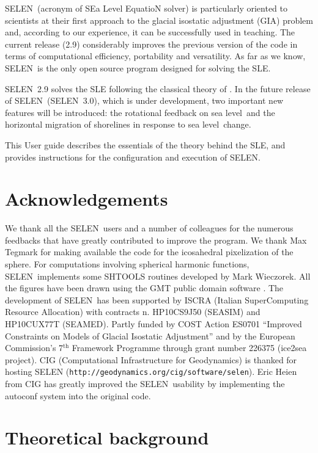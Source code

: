 \documentclass[11pt,fleqn,a4paper,titlepage]{article}
\newcommand\selen{\textsf{SELEN~}}
\newcommand\selens{\textsf{SELEN}}
\newcommand\sealevel{sea level~}
\begin{document}
\selen (acronym of SEa Level EquatioN solver) is particularly oriented to scientists at their first approach to the glacial isostatic adjustment (GIA) problem and, according to our experience, it can be successfully used in teaching. The current release (2.9) considerably improves the previous version of the code in terms of computational efficiency, portability and versatility. As far as we know, 
\selen is the only open source program designed for solving the SLE. 

\selen 2.9 solves the SLE following the classical theory of \citet{Farrell_and_Clark_1976}. In the future release of \selen (\selen 3.0), which is under development, two important new features will be introduced: the rotational feedback on \sealevel and the horizontal migration of shorelines in response to \sealevel change. 

This User guide describes the essentials of the theory behind the SLE, and provides instructions for the configuration and execution of \selens. 

\section{Acknowledgements}
We thank all the \selen users and a number of colleagues for the numerous feedbacks that have greatly contributed to improve the program. We thank Max Tegmark for making available the code for the icosahedral pixelization of the sphere. For computations involving spherical harmonic functions, \selen implements some {SHTOOLS} routines developed by Mark Wieczorek. All the figures have been drawn using the GMT public domain software \citep{Wessel_and_Smith_1998}. The development of \selen has been supported by ISCRA (Italian SuperComputing Resource Allocation) with contracts n. HP10CS9J50 (SEASIM) and HP10CUX77T (SEAMED). Partly funded by COST Action ES0701 ``Improved Constraints on Models of Glacial Isostatic Adjustment'' and by the European Commission's 7$^{\textrm{th}}$ Framework Programme through grant number 226375 (ice2sea project). CIG (Computational Infrastructure for Geodynamics) is thanked for hosting SELEN (\texttt{http://geodynamics.org/cig/software/selen}). Eric Heien from CIG has greatly improved the \selen usability by implementing the autoconf system into the original code.
\clearpage

\section{Theoretical background}\label{sec:theory}
\end{document}
